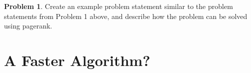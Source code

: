 \documentclass[10pt]{exam}
\theoremstyle{definition}
\newtheorem{problem}{Problem}
\newcommand{\x}{\mathbf x}
\newcommand{\ltwo}[1]{{\lVert {#1} \rVert}_2}
\begin{document}
\newpage
\begin{problem}
    Create an example problem statement similar to the problem statements from Problem 1 above,
    and describe how the problem can be solved using pagerank.
\end{problem}


%

\newpage
\section{A Faster Algorithm?}
\end{document}
